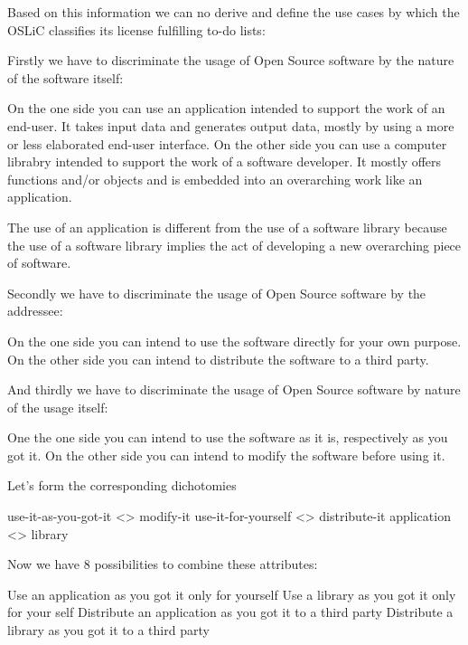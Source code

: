  Based on this information we can no derive and define the use cases by
which the OSLiC classifies its license fulfilling to-do lists:

Firstly we have to discriminate the usage of Open Source software by the nature
of the software itself:

On the one side you can use an application intended to support the work of an
end-user. It takes input data and generates output data, mostly by using a more
or less elaborated end-user interface. On the other side you can use a computer
librabry intended to support the work of a software developer. It mostly offers
functions and/or objects and is embedded into an overarching work like an
application.

The use of an application is different from the use of a software library
because the use of a software library implies the act of developing a new
overarching piece of software.

Secondly we have to discriminate the usage of Open Source software by the
addressee:

On the one side you can intend to use the software directly for your own
purpose. On the other side you can intend to distribute the software to a third
party.

And thirdly we have to discriminate the usage of Open Source software by nature of
the usage itself:

One the one side you can intend to use the software as it is, respectively as
you got it. On the other side you can intend to modify the software before using
it.

Let's form the corresponding dichotomies

use-it-as-you-got-it <> modify-it
use-it-for-yourself <> distribute-it
application <> library

Now we have 8 possibilities to combine these attributes:

Use an application as you got it only for yourself
Use a library as you got it only for your self
Distribute an application as you got it to a third party
Distribute a library as you got it to a third party




%
